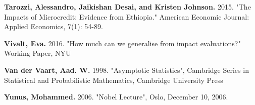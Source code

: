 \documentclass[AER]{AEA}
\begin{document}
\begin{thebibliography}{99}
 \textbf{ Tarozzi, Alessandro, Jaikishan Desai, and Kristen Johnson. }2015. "The Impacts of Microcredit: Evidence from Ethiopia." American Economic Journal: Applied Economics, 7(1): 54-89.

 \textbf{ Vivalt, Eva.} 2016. "How much can we generalise from impact evaluations?" Working Paper, NYU

 \textbf{ Van der Vaart, Aad. W.} 1998. "Asymptotic Statistics", Cambridge Series in Statistical and Probabilistic Mathematics, Cambridge University Press

 \textbf{ Yunus, Mohammed.} 2006. "Nobel Lecture", Oslo, December 10, 2006.


\end{thebibliography}
\end{document}
